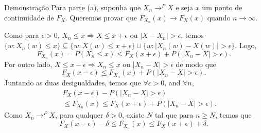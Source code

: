 \begin{frame}
\begin{block}{Demonstração}
Para parte (a), suponha que $X_n\rightarrow^P X$ e seja $x$ um
ponto de continuidade de $F_X$. Queremos provar que
$F_{X_n}(x)\rightarrow F_X(x)$ quando $n\rightarrow\infty$.

Como para $\epsilon>0$, $X_n\leq x \Rightarrow X\leq x+\epsilon$ ou
$|X-X_n|>\epsilon$, temos $\{w:X_n(w)\leq x\}\subseteq \{w:X(w)\leq
x+\epsilon\}\cup\{w:|X_n(w)-X(w)|>\epsilon\}$. Logo,
%
$$F_{X_n}(x)=P(X_n\leq x)\leq F_X(x+\epsilon)+P(|X_n-X|>\epsilon).$$
%
%
%
Por outro lado, $X\leq x-\epsilon\Rightarrow X_n\leq x$ ou
$|X_n-X|>\epsilon$ de modo que
%
$$F_X(x-\epsilon)\leq F_{X_n}(x)+P(|X_n-X|>\epsilon).$$
Juntando as duas desigualdades, temos que $\forall\epsilon>0$, and
$\forall n$,
%
\begin{eqnarray}
& & F_X(x-\epsilon)-P(|X_n-X|>\epsilon) \nonumber\\
& & \leq F_{X_n}(x)\leq F_X(x+\epsilon)+P(|X_n-X|>\epsilon).\nonumber
\end{eqnarray}
%
%
%
%
Como $X_n\rightarrow^P X$, para qualquer $\delta>0$, existe $N$ tal
que para $n\geq N$, temos que
$$F_X(x-\epsilon)-\delta \leq F_{X_n}(x)\leq F_X(x+\epsilon)+\delta.$$
%
\end{block}
\end{frame}

